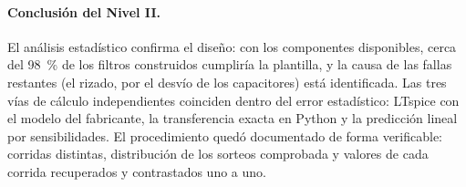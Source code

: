 \paragraph{Conclusión del Nivel II.} El análisis estadístico confirma el diseño: con los componentes disponibles, cerca del \qty{98}{\percent} de los
filtros construidos cumpliría la plantilla, y la causa de las fallas restantes (el rizado, por el desvío de los capacitores) está identificada. Las
tres vías de cálculo independientes coinciden dentro del error estadístico: LTspice con el modelo del fabricante, la transferencia exacta en Python y
la predicción lineal por sensibilidades. El procedimiento quedó documentado de forma verificable: corridas distintas, distribución de los sorteos
comprobada y valores de cada corrida recuperados y contrastados uno a uno.
